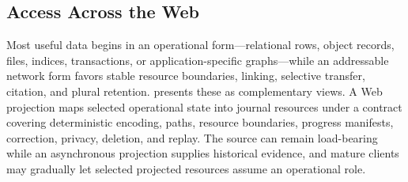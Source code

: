 \subsection{Access Across the Web}

Most useful data begins in an operational form---relational rows, object records, files, indices, transactions, or application-specific graphs---while an addressable network form favors stable resource boundaries, linking, selective transfer, citation, and plural retention.  presents these as complementary views. A Web projection maps selected operational state into journal resources under a contract covering deterministic encoding, paths, resource boundaries, progress manifests, correction, privacy, deletion, and replay. The source can remain load-bearing while an asynchronous projection supplies historical evidence, and mature clients may gradually let selected projected resources assume an operational role.

\begin{table}[htbp]
  \centering
  \small
  
  \caption{Complementary Data Forms}
  \label{tab:data-forms}
\end{table}

